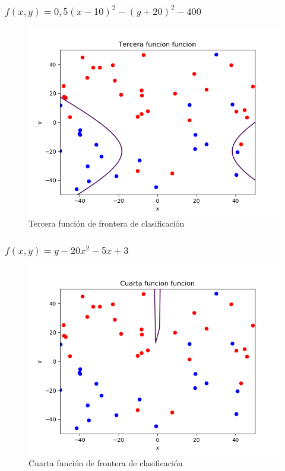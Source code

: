 \documentclass[12pt,a4paper]{article}
\begin{document}
\subsubsection{$f(x, y)=0,5(x-10)^{2}-(y+20)^{2}-400$}
\begin{figure}[H]  %
	\centering
	\includegraphics{images/tercerafuncion.png}  
	\caption{Tercera función de frontera de clasificación}
	\label{figura7}
\end{figure}
\subsubsection{$f(x, y)=y-20 x^{2}-5 x+3$}
\begin{figure}[H]  %
	\centering
	\includegraphics{images/cuartafuncion.png}  
	\caption{Cuarta función de frontera de clasificación}
	\label{figura8}
\end{figure}
\end{document}
